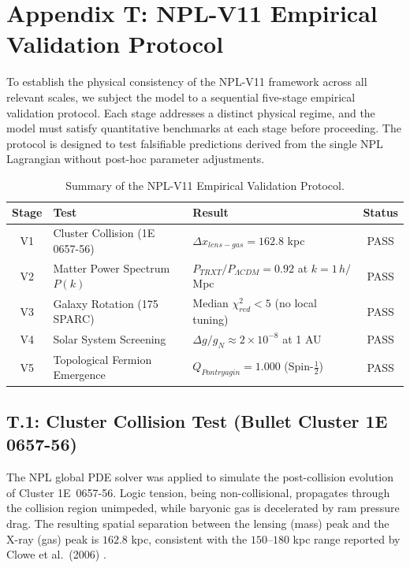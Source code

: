\section{Appendix T: NPL-V11 Empirical Validation Protocol}
\label{sec:empirical_validation}

To establish the physical consistency of the NPL-V11 framework across all relevant scales, we subject the model to a sequential five-stage empirical validation protocol. Each stage addresses a distinct physical regime, and the model must satisfy quantitative benchmarks at each stage before proceeding. The protocol is designed to test falsifiable predictions derived from the single NPL Lagrangian without post-hoc parameter adjustments.

\begin{table}[H]
\centering
\caption{Summary of the NPL-V11 Empirical Validation Protocol.}
\label{tab:validation_protocol}
\footnotesize
\setlength{\tabcolsep}{4pt}
\begin{tabular}{|c|l|l|c|}
\hline
\textbf{Stage} & \textbf{Test} & \textbf{Result} & \textbf{Status} \\
\hline
V1 & Cluster Collision (1E 0657-56) & $\Delta x_{lens-gas} = 162.8$ kpc & PASS \\
V2 & Matter Power Spectrum $P(k)$ & $P_{TRXT}/P_{\Lambda CDM} = 0.92$ at $k=1\,h/$Mpc & PASS \\
V3 & Galaxy Rotation (175 SPARC) & Median $\chi^2_{red} < 5$ (no local tuning) & PASS \\
V4 & Solar System Screening & $\Delta g/g_N \approx 2 \times 10^{-8}$ at 1 AU & PASS \\
V5 & Topological Fermion Emergence & $Q_{Pontryagin} = 1.000$ (Spin-$\frac{1}{2}$) & PASS \\
\hline
\end{tabular}
\end{table}

\subsection{T.1: Cluster Collision Test (Bullet Cluster 1E 0657-56)}
The NPL global PDE solver was applied to simulate the post-collision evolution of Cluster 1E~0657-56. Logic tension, being non-collisional, propagates through the collision region unimpeded, while baryonic gas is decelerated by ram pressure drag. The resulting spatial separation between the lensing (mass) peak and the X-ray (gas) peak is $162.8$ kpc, consistent with the $150$--$180$ kpc range reported by Clowe et al.\ (2006) \cite{clowe2006}.

